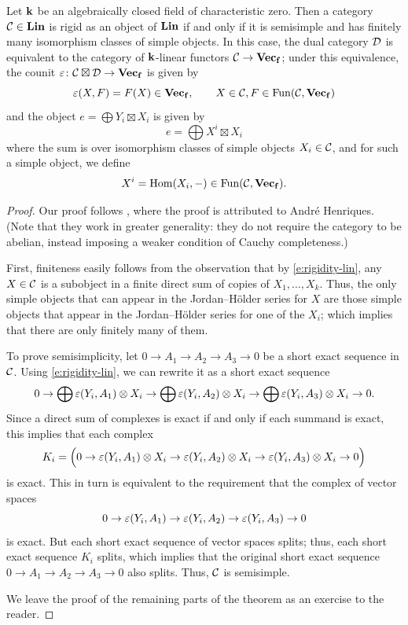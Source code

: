 \begin{theorem}\label{t:dualizable-linear}
  Let $\mathbf{k}$ be an algebraically closed field of characteristic zero. Then a
  category $\mathcal{C}\in \mathbf{Lin}$ is rigid as an object of $\mathbf{Lin}$ if and only if it
  is semisimple and has finitely many isomorphism classes of simple objects. In
  this case, the dual category $\mathcal{D}$ is equivalent to the category of
  $\mathbf{k}$-linear functors $\mathcal{C}\to \mathbf{Vec_f}$; under this equivalence, the counit
  $\varepsilon\colon \mathcal{C}\boxtimes\mathcal{D}\to \mathbf{Vec_f}$ is given by
  $$
    \varepsilon(X,F) = F(X)\in \mathbf{Vec_f},\qquad X\in \mathcal{C}, F\in \operatorname{Fun}(\mathcal{C}, \mathbf{Vec_f})
  $$
  and the object $e=\bigoplus Y_i\boxtimes X_i$ is given by
  $$
    e=\bigoplus X^i \boxtimes X_i
  $$
  where the sum is over isomorphism classes of simple objects $X_i\in \mathcal{C}$,
  and for such a simple object, we define
  $$
    X^i=\operatorname{Hom}(X_i, -)\in \operatorname{Fun}(\mathcal{C}, \mathbf{Vec_f}).
  $$
\end{theorem}
\begin{proof}
  Our proof follows \cite[Section A.6]{bdspv}, where the proof is attributed
  to Andr\'e Henriques. (Note that they work in greater generality: they do not
  require the category to be abelian, instead imposing a weaker condition of
  Cauchy completeness.)


  First, finiteness easily follows from the observation that by
  \eqref{e:rigidity-lin}, any $X\in \mathcal{C}$ is a subobject in a finite direct sum
  of copies of $X_1, \dots, X_k$. Thus, the only simple objects that can appear
  in the Jordan--H\"older series for $X$ are those simple objects that appear in
  the Jordan--H\"older series for one of the $X_i$; which implies that there are only
  finitely many of them.

  To prove semisimplicity, let $0\to A_1\to A_2\to A_3\to 0$ be a short exact
  sequence in $\mathcal{C}$. Using \eqref{e:rigidity-lin}, we can rewrite it as a
  short exact sequence
  $$
  0 \to \bigoplus \varepsilon(Y_i, A_1)\otimes X_i
    \to \bigoplus \varepsilon(Y_i, A_2)\otimes X_i
    \to \bigoplus \varepsilon(Y_i, A_3)\otimes X_i
  \to 0.
  $$
  Since a direct sum of complexes is exact if and only if each summand is
  exact, this implies that each complex
  $$
  K_i = \Bigl(
      0 \to  \varepsilon(Y_i, A_1)\otimes X_i
          \to  \varepsilon(Y_i, A_2)\otimes X_i
          \to \varepsilon(Y_i, A_3)\otimes X_i
        \to 0
        \Bigr)
  $$
  is exact. This in turn is equivalent to the requirement that the complex of
  vector spaces
  $$
    0 \to  \varepsilon(Y_i, A_1)
            \to  \varepsilon(Y_i, A_2)
            \to \varepsilon(Y_i, A_3)
    \to 0
  $$
  is exact. But each short exact sequence of vector spaces splits; thus, each
  short exact sequence $K_i$ splits, which implies that the original short
  exact sequence $0\to A_1\to A_2\to A_3\to 0$ also splits. Thus, $\mathcal{C}$ is
  semisimple.

  We leave the proof of the remaining parts of the theorem as an exercise to the
  reader.
 \end{proof}

